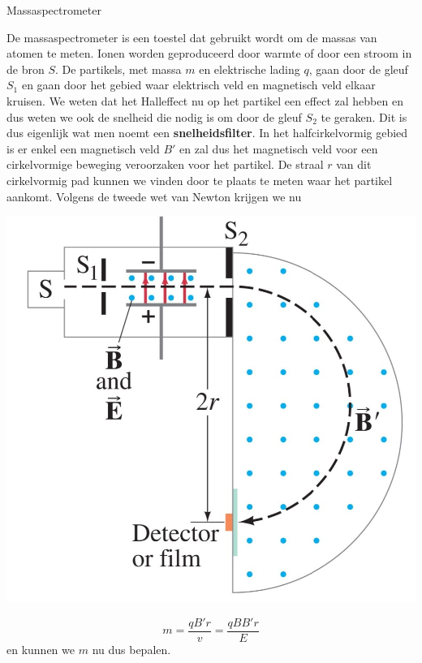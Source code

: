 \begin{app}[Massaspectrometer]{Massaspectrometer}
    \begin{minipage}{.7\textwidth}
        De massaspectrometer is een toestel dat gebruikt wordt om de massas van atomen te meten.
        Ionen worden geproduceerd door warmte of door een stroom in de bron $S$.  De partikels, met massa $m$ en elektrische lading $q$, 
        gaan door de gleuf $S_{1}$ en gaan door het gebied waar elektrisch veld en magnetisch veld elkaar kruisen. We weten dat 
        het Halleffect nu op het partikel een effect zal hebben en dus weten we ook de snelheid die nodig is om door de gleuf $S_{2}$ 
        te geraken. Dit is dus eigenlijk wat men noemt een \textbf{snelheidsfilter}. 
        In het halfcirkelvormig gebied is er enkel een magnetisch veld $B'$ en zal dus het magnetisch veld voor een cirkelvormige beweging veroorzaken voor het partikel. 
        De straal $r$ van dit cirkelvormig pad kunnen we vinden door te plaats te meten waar het partikel aankomt. Volgens de tweede wet van Newton krijgen we nu 
    \end{minipage}
    \begin{minipage}{.28\textwidth}
        \vspace{-0.25cm}
        \includegraphics[scale = 0.5]{Images/Magnetisme/Massaspectrometer.png}
    \end{minipage}
    \vspace{0.25cm}

    \begin{equation*}
        m = \dfrac{qB'r}{v} = \dfrac{qBB'r}{E}
    \end{equation*}
    en kunnen we $m$ nu dus bepalen.
\end{app}
